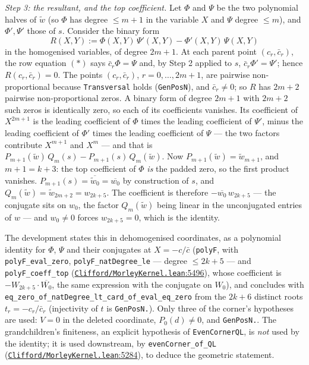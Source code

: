 \documentclass[11pt]{article}
\theoremstyle{definition}
\theoremstyle{remark}
\begin{document}
\emph{Step 3: the resultant, and the top coefficient.} Let \(\Phi\) and \(\Psi\) be the two polynomial halves of
\(\tilde w\) (so \(\Phi\) has degree \(\le m+1\) in the variable \(X\) and \(\Psi\) degree \(\le m\)), and \(\Phi', \Psi'\)
those of \(s\). Consider the binary form
\[ R(X,Y) := \Phi(X,Y)\,\Psi'(X,Y) - \Phi'(X,Y)\,\Psi(X,Y) \]
in the homogenised variables, of degree \(2m+1\). At each parent point \((c_r, \bar c_r)\), the row equation
\((\ast)\) says \(\bar c_r \Phi = \Psi\) and, by Step 2 applied to \(s\), \(\bar c_r \Phi' = \Psi'\); hence
\(R(c_r, \bar c_r) = 0\). The points \((c_r, \bar c_r)\), \(r = 0, \dots, 2m+1\), are pairwise non-proportional
because \texttt{Transversal} holds (\texttt{GenPosN}), and \(\bar c_r \ne 0\); so \(R\) has \(2m+2\) pairwise
non-proportional zeros. A binary form of degree \(2m+1\) with \(2m+2\) such zeros is identically zero, so each
of its coefficients vanishes. Its coefficient of \(X^{2m+1}\) is the leading coefficient of \(\Phi\) times
the leading coefficient of \(\Psi'\), minus the leading coefficient of \(\Phi'\) times the leading coefficient
of \(\Psi\) --- the two factors contribute \(X^{m+1}\) and \(X^{m}\) --- and that is
\(P_{m+1}(\tilde w)\, Q_m(s) - P_{m+1}(s)\, Q_m(\tilde w)\). Now \(P_{m+1}(\tilde w) = \tilde w_{m+1}\),
and \(m+1 = k+3\): the top coefficient of \(\Phi\) \emph{is} the padded zero, so the first product vanishes.
\(P_{m+1}(s) = \overline{\tilde w_0} = \overline{w_0}\) by construction of \(s\), and
\(Q_m(\tilde w) = \tilde w_{2m+2} = w_{2k+5}\). The coefficient is therefore
\(-\overline{w_0}\, w_{2k+5}\) --- the conjugate sits on \(w_0\), the factor \(Q_m(\tilde w)\) being linear in
the unconjugated entries of \(w\) --- and \(w_0 \ne 0\) forces \(w_{2k+5} = 0\), which is the identity.

The development states this in dehomogenised coordinates, as a polynomial identity for \(\Phi\), \(\Psi\) and
their conjugates at \(X = -c/\bar c\) (\texttt{polyF}, with \texttt{polyF\_\allowbreak eval\_\allowbreak zero}, \texttt{polyF\_\allowbreak natDegree\_\allowbreak le} --- degree
\(\le 2k+5\) --- and \texttt{polyF\_\allowbreak coeff\_\allowbreak top} (\href{https://github.com/jpbald93/paperl_clifford_chain/blob/e1ae145c2565cc98816635387412edc0a740c27c/Clifford/MorleyKernel.lean\#L5496}{\texttt{Clifford/\allowbreak MorleyKernel.lean}:5496}), whose coefficient is
\(-W_{2k+5} \cdot \overline{W_0}\), the same expression with the conjugate on \(W_0\)), and concludes with
\texttt{eq\_\allowbreak zero\_\allowbreak of\_\allowbreak natDegree\_\allowbreak lt\_\allowbreak card\_\allowbreak of\_\allowbreak eval\_\allowbreak eq\_\allowbreak zero} from the \(2k+6\) distinct roots
\(t_r = -c_r/\bar c_r\) (injectivity of \(t\) is \texttt{GenPosN.}). Only three of the corner's hypotheses are used:
\(V = 0\) in the deleted coordinate, \(P_0(d) \ne 0\), and \texttt{GenPosN.}. The grandchildren's finiteness, an
explicit hypothesis of \texttt{EvenCornerQL}, is \emph{not} used by the identity; it is used downstream, by
\texttt{evenCorner\_\allowbreak of\_\allowbreak QL} (\href{https://github.com/jpbald93/paperl_clifford_chain/blob/e1ae145c2565cc98816635387412edc0a740c27c/Clifford/MorleyKernel.lean\#L5284}{\texttt{Clifford/\allowbreak MorleyKernel.lean}:5284}), to deduce the geometric statement.
\end{document}
